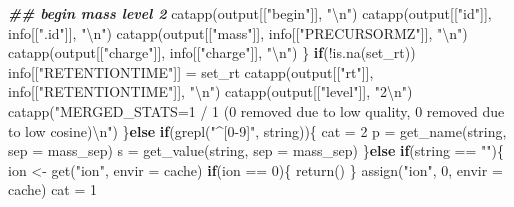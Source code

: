 \documentclass[
]{article}
\newenvironment{Shaded}{\begin{snugshade}}{\end{snugshade}}
\newcommand{\AttributeTok}[1]{\textcolor[rgb]{0.77,0.63,0.00}{#1}}
\newcommand{\ControlFlowTok}[1]{\textcolor[rgb]{0.13,0.29,0.53}{\textbf{#1}}}
\newcommand{\DecValTok}[1]{\textcolor[rgb]{0.00,0.00,0.81}{#1}}
\newcommand{\DocumentationTok}[1]{\textcolor[rgb]{0.56,0.35,0.01}{\textbf{\textit{#1}}}}
\newcommand{\FunctionTok}[1]{\textcolor[rgb]{0.00,0.00,0.00}{#1}}
\newcommand{\NormalTok}[1]{#1}
\newcommand{\OtherTok}[1]{\textcolor[rgb]{0.56,0.35,0.01}{#1}}
\newcommand{\SpecialCharTok}[1]{\textcolor[rgb]{0.00,0.00,0.00}{#1}}
\newcommand{\StringTok}[1]{\textcolor[rgb]{0.31,0.60,0.02}{#1}}
\begin{document}
\begin{Shaded}
\begin{Highlighting}[]
        \DocumentationTok{\#\# begin mass level 2}
        \FunctionTok{catapp}\NormalTok{(output[[}\StringTok{"begin"}\NormalTok{]], }\StringTok{"}\SpecialCharTok{\textbackslash{}n}\StringTok{"}\NormalTok{)}
        \FunctionTok{catapp}\NormalTok{(output[[}\StringTok{"id"}\NormalTok{]], info[[}\StringTok{".id"}\NormalTok{]], }\StringTok{"}\SpecialCharTok{\textbackslash{}n}\StringTok{"}\NormalTok{)}
        \FunctionTok{catapp}\NormalTok{(output[[}\StringTok{"mass"}\NormalTok{]], info[[}\StringTok{"PRECURSORMZ"}\NormalTok{]], }\StringTok{"}\SpecialCharTok{\textbackslash{}n}\StringTok{"}\NormalTok{)}
        \FunctionTok{catapp}\NormalTok{(output[[}\StringTok{"charge"}\NormalTok{]], info[[}\StringTok{"charge"}\NormalTok{]], }\StringTok{"}\SpecialCharTok{\textbackslash{}n}\StringTok{"}\NormalTok{)}
\NormalTok{      \}}
      \ControlFlowTok{if}\NormalTok{(}\SpecialCharTok{!}\FunctionTok{is.na}\NormalTok{(set\_rt))}
\NormalTok{        info[[}\StringTok{"RETENTIONTIME"}\NormalTok{]] }\OtherTok{=}\NormalTok{ set\_rt}
      \FunctionTok{catapp}\NormalTok{(output[[}\StringTok{"rt"}\NormalTok{]], info[[}\StringTok{"RETENTIONTIME"}\NormalTok{]], }\StringTok{"}\SpecialCharTok{\textbackslash{}n}\StringTok{"}\NormalTok{)}
      \FunctionTok{catapp}\NormalTok{(output[[}\StringTok{"level"}\NormalTok{]], }\StringTok{"2}\SpecialCharTok{\textbackslash{}n}\StringTok{"}\NormalTok{)}
      \FunctionTok{catapp}\NormalTok{(}\StringTok{"MERGED\_STATS=1 / 1 (0 removed due to low quality, 0 removed due to low cosine)}\SpecialCharTok{\textbackslash{}n}\StringTok{"}\NormalTok{)}
\NormalTok{    \}}\ControlFlowTok{else} \ControlFlowTok{if}\NormalTok{(}\FunctionTok{grepl}\NormalTok{(}\StringTok{"\^{}[0{-}9]"}\NormalTok{, string))\{}
\NormalTok{      cat }\OtherTok{=} \DecValTok{2}
\NormalTok{      p }\OtherTok{=} \FunctionTok{get\_name}\NormalTok{(string, }\AttributeTok{sep =}\NormalTok{ mass\_sep)}
\NormalTok{      s }\OtherTok{=} \FunctionTok{get\_value}\NormalTok{(string, }\AttributeTok{sep =}\NormalTok{ mass\_sep)}
\NormalTok{    \}}\ControlFlowTok{else} \ControlFlowTok{if}\NormalTok{(string }\SpecialCharTok{==} \StringTok{""}\NormalTok{)\{}
\NormalTok{      ion }\OtherTok{\textless{}{-}} \FunctionTok{get}\NormalTok{(}\StringTok{"ion"}\NormalTok{, }\AttributeTok{envir =}\NormalTok{ cache)}
      \ControlFlowTok{if}\NormalTok{(ion }\SpecialCharTok{==} \DecValTok{0}\NormalTok{)\{}
        \FunctionTok{return}\NormalTok{()}
\NormalTok{      \}}
      \FunctionTok{assign}\NormalTok{(}\StringTok{"ion"}\NormalTok{, }\DecValTok{0}\NormalTok{, }\AttributeTok{envir =}\NormalTok{ cache)}
\NormalTok{      cat }\OtherTok{=} \DecValTok{1}

\end{Highlighting}
\end{Shaded}
\end{document}
